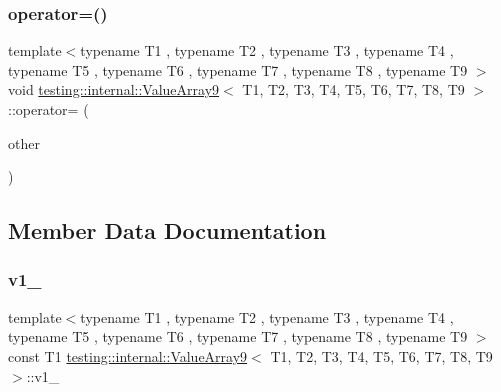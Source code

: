 \subsubsection{\texorpdfstring{operator=()}{operator=()}}
{\footnotesize\ttfamily template$<$typename T1 , typename T2 , typename T3 , typename T4 , typename T5 , typename T6 , typename T7 , typename T8 , typename T9 $>$ \\
void \mbox{\hyperlink{classtesting_1_1internal_1_1_value_array9}{testing\+::internal\+::\+Value\+Array9}}$<$ T1, T2, T3, T4, T5, T6, T7, T8, T9 $>$\+::operator= (\begin{DoxyParamCaption}\item[{const \mbox{\hyperlink{classtesting_1_1internal_1_1_value_array9}{Value\+Array9}}$<$ T1, T2, T3, T4, T5, T6, T7, T8, T9 $>$ \&}]{other }\end{DoxyParamCaption})\hspace{0.3cm}{\ttfamily [private]}}



\subsection{Member Data Documentation}
\mbox{\label{classtesting_1_1internal_1_1_value_array9_a92de55b339b0ecbecc999794c66d37e8}} 
\subsubsection{\texorpdfstring{v1\_}{v1\_}}
{\footnotesize\ttfamily template$<$typename T1 , typename T2 , typename T3 , typename T4 , typename T5 , typename T6 , typename T7 , typename T8 , typename T9 $>$ \\
const T1 \mbox{\hyperlink{classtesting_1_1internal_1_1_value_array9}{testing\+::internal\+::\+Value\+Array9}}$<$ T1, T2, T3, T4, T5, T6, T7, T8, T9 $>$\+::v1\+\_\+\hspace{0.3cm}{\ttfamily [private]}}

\mbox{\label{classtesting_1_1internal_1_1_value_array9_a30fe1d08a464339d29424c25c8cbb4b0}} 
